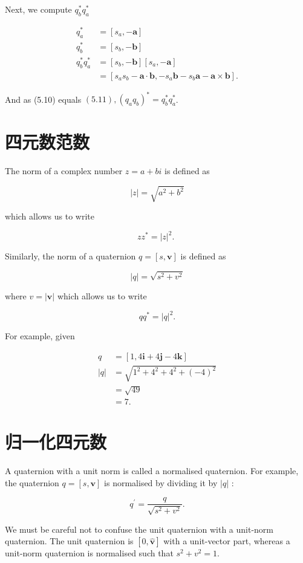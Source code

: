 Next, we compute $q_{b}^{*} q_{a}^{*}$

$$
\begin{aligned}
q_{a}^{*} & =\left[s_{a},-\mathbf{a}\right] \\
q_{b}^{*} & =\left[s_{b},-\mathbf{b}\right] \\
q_{b}^{*} q_{a}^{*} & =\left[s_{b},-\mathbf{b}\right]\left[s_{a},-\mathbf{a}\right] \\
& =\left[s_{a} s_{b}-\mathbf{a} \cdot \mathbf{b},-s_{a} \mathbf{b}-s_{b} \mathbf{a}-\mathbf{a} \times \mathbf{b}\right] .
\end{aligned}
$$

And as (5.10) equals $(5.11),\left(q_{a} q_{b}\right)^{*}=q_{b}^{*} q_{a}^{*}$.

\section{四元数范数}
The norm of a complex number $z=a+b i$ is defined as

$$
|z|=\sqrt{a^{2}+b^{2}}
$$

which allows us to write

$$
z z^{*}=|z|^{2} \text {. }
$$

Similarly, the norm of a quaternion $q=[s, \mathbf{v}]$ is defined as

$$
|q|=\sqrt{s^{2}+v^{2}}
$$

where $v=|\mathbf{v}|$ which allows us to write

$$
q q^{*}=|q|^{2} .
$$

For example, given

$$
\begin{aligned}
q & =[1,4 \mathbf{i}+4 \mathbf{j}-4 \mathbf{k}] \\
|q| & =\sqrt{1^{2}+4^{2}+4^{2}+(-4)^{2}} \\
& =\sqrt{49} \\
& =7 .
\end{aligned}
$$

\section{归一化四元数}
A quaternion with a unit norm is called a normalised quaternion. For example, the quaternion $q=[s, \mathbf{v}]$ is normalised by dividing it by $|q|$ :

$$
q^{\prime}=\frac{q}{\sqrt{s^{2}+v^{2}}} .
$$

We must be careful not to confuse the unit quaternion with a unit-norm quaternion. The unit quaternion is $[0, \hat{\mathbf{v}}]$ with a unit-vector part, whereas a unit-norm quaternion is normalised such that $s^{2}+v^{2}=1$.

